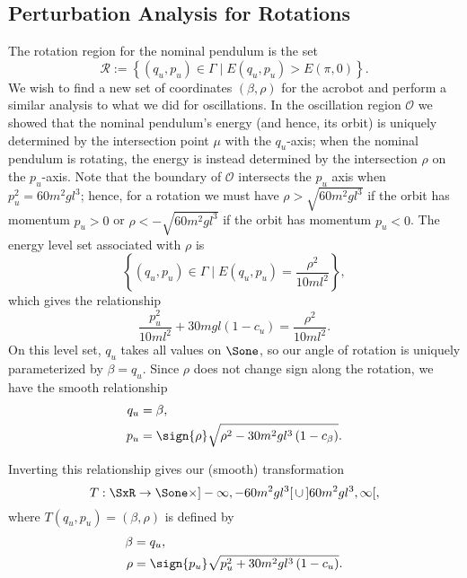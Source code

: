 \subsection*{Perturbation Analysis for Rotations}
The rotation region for the nominal pendulum is the set
\[
    \mathcal{R} := \left\{ (q_u,p_u) \in \Gamma \mid E(q_u,p_u) > E(\pi,0)\right\}
    .
\]
We wish to find a new set of coordinates \((\beta,\rho)\) for the acrobot
and perform a similar analysis to what we did for oscillations.
In the oscillation region \(\mathcal{O}\) we showed that the nominal pendulum's
energy (and hence, its orbit) is uniquely determined by the intersection point
\(\mu\) with the \(q_u\)-axis; 
when the nominal pendulum is rotating, the energy is instead determined by the
intersection \(\rho\) on the \(p_u\)-axis.
Note that the boundary of \(\mathcal{O}\) intersects the \(p_u\) axis when 
\(p_u^2 = 60m^2 g l^3\); 
hence, for a rotation we must have \(\rho > \sqrt{60 m^2 g l^3}\) if the
orbit has momentum \(p_u > 0\) 
or \(\rho < -\sqrt{60 m^2 g l^3}\) if the orbit has momentum \(p_u < 0\).
The energy level set associated with \(\rho\) is
\[
    \left\{(q_u,p_u) \in \Gamma \mid E(q_u,p_u) = \frac{\rho^2}{10ml^2}\right\}
    ,
\]
which gives the relationship
\begin{equation}\label{eqn:rotation-pu2}
    \frac{p_u^2}{10m l^2} + 30mgl(1 - c_u) = \frac{\rho^2}{10 ml^2}
    .
\end{equation}
On this level set, \(q_u\) takes all values on \(\Sone\), so our angle of
rotation is uniquely parameterized by \(\beta = q_u\).
Since \(\rho\) does not change sign along the rotation, we have the smooth
relationship
\begin{align}\label{eqn:rotation-Tinv}
    q_u &= \beta
    , \\
    p_u &= \sign{\rho}\sqrt{\rho^2 - 30 m^2 g l^3\left(1 - c_\beta \right)}
    .
\end{align}

Inverting this relationship gives our (smooth) transformation
\begin{equation*}
    T : \SxR \rightarrow 
    \Sone \times ]-\infty,-60m^2gl^3[\, \cup \, ]60m^2gl^3,\infty[ 
    ,
\end{equation*}
where \(T(q_u,p_u) = (\beta,\rho)\) is defined by
\begin{align}\label{eqn:rotation-T}
    \beta &= q_u
    , \\
    \rho &= \sign{p_u}\sqrt{p_u^2 + 30 m^2 g l^3 \left(1 - c_u \right)}
    .
\end{align}

